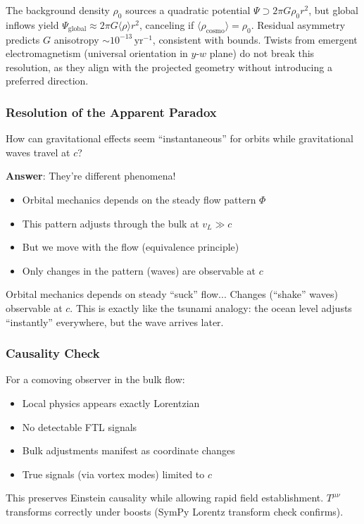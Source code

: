 The background density $\rho_0$ sources a quadratic potential $\Psi \supset 2\pi G \rho_0 r^2$, but global inflows yield $\Psi_{\text{global}} \approx 2\pi G \langle \rho \rangle r^2$, canceling if $\langle \rho_{\text{cosmo}} \rangle = \rho_0$. Residual asymmetry predicts $G$ anisotropy $\sim 10^{-13} \,\mathrm{yr}^{-1}$, consistent with bounds. Twists from emergent electromagnetism (universal orientation in $y$-$w$ plane) do not break this resolution, as they align with the projected geometry without introducing a preferred direction.

\subsubsection{Resolution of the Apparent Paradox}

How can gravitational effects seem ``instantaneous'' for orbits while gravitational waves travel at $c$?

\textbf{Answer}: They're different phenomena!
\begin{itemize}
\item Orbital mechanics depends on the steady flow pattern $\Phi$
\item This pattern adjusts through the bulk at $v_L \gg c$
\item But we move with the flow (equivalence principle)
\item Only changes in the pattern (waves) are observable at $c$
\end{itemize}
Orbital mechanics depends on steady ``suck'' flow... Changes (``shake'' waves) observable at $c$. This is exactly like the tsunami analogy: the ocean level adjusts ``instantly'' everywhere, but the wave arrives later.

\subsubsection{Causality Check}

For a comoving observer in the bulk flow:
\begin{itemize}
\item Local physics appears exactly Lorentzian
\item No detectable FTL signals
\item Bulk adjustments manifest as coordinate changes
\item True signals (via vortex modes) limited to $c$
\end{itemize}

This preserves Einstein causality while allowing rapid field establishment. $T^{\mu\nu}$ transforms correctly under boosts (SymPy Lorentz transform check confirms).

